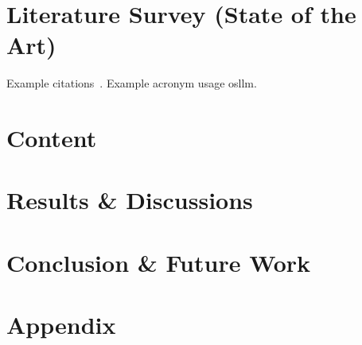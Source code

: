 \documentclass[%
]{tumDiss}
\begin{document}
\chapter{Literature Survey (State of the Art)}
\label{chap:sota}

Example citations~\cite{barham2003xen, LIS}.
Example acronym usage \gls{osllm}.


\chapter{Content}
\label{chap:content}



\chapter{Results \& Discussions}
\label{chap:conclusion}
\lipsum[1-4]


\chapter{Conclusion \& Future Work}
\label{chap:conclusion}
\lipsum[1-4]



\backmatter





\appendix
\chapter{Appendix}

\lipsum[1-4]
\end{document}
